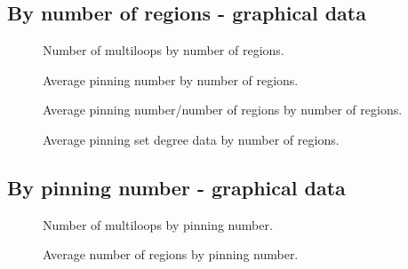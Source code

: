 \documentclass{article}%
\begin{document}
\newpage

\subsection{By number of regions - graphical data}
\label{sec:byNumRegionsGraph}

\begin{multicols}{2}
\begin{figure}[H]
\centering
\scalebox{0.6}{}
\caption{Number of multiloops by number of regions.}
\label{fig:tex/img/numRegionsNumloops.pgf}
\end{figure}
\columnbreak

\begin{figure}[H]
\centering
\scalebox{0.6}{}
\caption{Average pinning number by number of regions.}
\label{fig:tex/img/numRegionsAvgPinNum.pgf}
\end{figure}
\end{multicols}

\begin{multicols}{2}
\begin{figure}[H]
\centering
\scalebox{0.6}{}
\caption{Average pinning number/number of regions by number of regions.}
\label{fig:tex/img/numRegionsAvgsPercentages.pgf}
\end{figure}
\columnbreak

\begin{figure}[H]
\centering
\scalebox{0.6}{}
\caption{Average pinning set degree data by number of regions.}
\label{fig:tex/img/numRegionsGonalities.pgf}
\end{figure}
\end{multicols}



\newpage

\subsection{By pinning number - graphical data}
\label{sec:byPinningGraph}

\begin{multicols}{2}
\begin{figure}[H]
\centering
\scalebox{0.6}{}
\caption{Number of multiloops by pinning number.}
\label{fig:tex/img/pinNumsNumloops.pgf}
\end{figure}
\columnbreak

\begin{figure}[H]
\centering
\scalebox{0.6}{}
\caption{Average number of regions by pinning number.}
\label{fig:tex/img/pinNumsAvgsRegions.pgf}
\end{figure}
\end{multicols}
\end{document}
